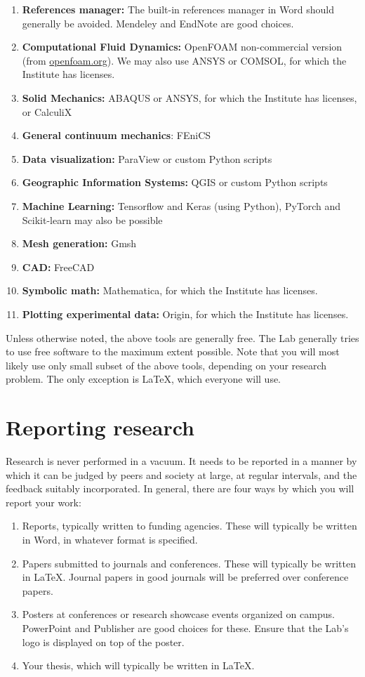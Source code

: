 \documentclass[12pt]{article}
\begin{document}
\begin{enumerate}
	\item \textbf{References manager:} The built-in references manager in Word should generally be avoided. Mendeley and EndNote are good choices.
	\item \textbf{Computational Fluid Dynamics:} OpenFOAM non-commercial version (from \href{http://openfoam.org/}{openfoam.org}). We may also use ANSYS or COMSOL, for which the Institute has licenses.
	\item \textbf{Solid Mechanics:} ABAQUS or ANSYS, for which the Institute has licenses, or CalculiX
	\item \textbf{General continuum mechanics}: FEniCS
	\item \textbf{Data visualization:} ParaView or custom Python scripts
	\item \textbf{Geographic Information Systems:} QGIS or custom Python scripts
	\item \textbf{Machine Learning:} Tensorflow and Keras (using Python), PyTorch and Scikit-learn may also be possible
	\item \textbf{Mesh generation:} Gmsh
	\item \textbf{CAD:} FreeCAD
	\item \textbf{Symbolic math:} Mathematica, for which the Institute has licenses.
	\item \textbf{Plotting experimental data:} Origin, for which the Institute has licenses.
\end{enumerate}

Unless otherwise noted, the above tools are generally free. The Lab generally tries to use free software to the maximum extent possible. Note that you will most likely use only small subset of the above tools, depending on your research problem. The only exception is \LaTeX, which everyone will use.

\newpage

\section{Reporting research}

Research is never performed in a vacuum. It needs to be reported in a manner by which it can be judged by peers and society at large, at regular intervals, and the feedback suitably incorporated. In general, there are four ways by which you will report your work:

\begin{enumerate}
	\item Reports, typically written to funding agencies. These will typically be written in Word, in whatever format is specified.
	\item Papers submitted to journals and conferences. These will typically be written in \LaTeX. Journal papers in good journals will be preferred over conference papers.
	\item Posters at conferences or research showcase events organized on campus. PowerPoint and Publisher are good choices for these. Ensure that the Lab's logo is displayed on top of the poster.
	\item Your thesis, which will typically be written in \LaTeX.
\end{enumerate}
\end{document}
